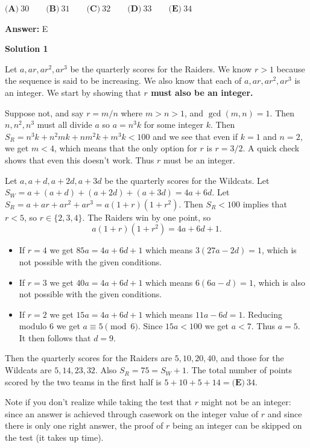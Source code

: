 \begin{enumerate}
 $\textbf{(A)}\ 30 \qquad \textbf{(B)}\ 31 \qquad \textbf{(C)}\ 32 \qquad \textbf{(D)}\ 33 \qquad \textbf{(E)}\ 34$

 \textbf{Answer: }E



\textbf{Solution 1}

Let $a,ar,ar^{2},ar^{3}$ be the quarterly scores for the Raiders. We know $r > 1$ because the sequence is said to be increasing. We also know that each of $a, ar, ar^2, ar^3$ is an integer. We start by showing that \textbf{$r$ must also be an integer.}

 Suppose not, and say $r = m/n$ where $m>n>1$, and $\gcd(m,n)=1$. Then $n, n^2, n^3$ must all divide $a$ so $a=n^3k$ for some integer $k$. Then $S_R = n^3k + n^2mk + nm^2k + m^3k < 100$ and we see that even if $k=1$ and $n=2$, we get $m < 4$, which means that the only option for $r$ is $r=3/2$. A quick check shows that even this doesn't work. Thus $r$ must be an integer.

 Let $a, a+d, a+2d, a+3d$ be the quarterly scores for the Wildcats. Let $S_W = a+(a+d) + (a+2d)+(a+3d) = 4a+6d$. Let $S_R = a+ar+ar^2+ar^3 = a(1+r)(1+r^2)$. Then $S_R<100$ implies that $r<5$, so $r\in \{2, 3, 4\}$. The Raiders win by one point, so
 \[a(1+r)(1+r^2) = 4a+6d+1.\]

            \begin{itemize}
        \item If $r=4$ we get $85a = 4a+6d+1$ which means $3(27a-2d) = 1$, which is not possible with the given conditions.
        \item If $r=3$ we get $40a = 4a+6d+1$ which means $6(6a-d) = 1$, which is also not possible with the given conditions.
        \item If $r=2$ we get $15a = 4a+6d+1$ which means $11a-6d = 1$. Reducing modulo 6 we get $a \equiv 5\pmod{6}$. Since $15a<100$ we get $a<7$. Thus $a=5$. It then follows that $d=9$.
            \end{itemize}
            Then the quarterly scores for the Raiders are $5, 10, 20, 40$, and those for the Wildcats are $5, 14, 23, 32$. Also $S_R = 75 = S_W + 1$. The total number of points scored by the two teams in the first half is $5+10+5+14=\boxed{\textbf{(E)}\ 34}$.

 Note if you don't realize while taking the test that $r$ might not be an integer: since an answer is achieved through casework on the integer value of $r$ and since there is only one right answer, the proof of $r$ being an integer can be skipped on the test (it takes up time).


\end{enumerate}
